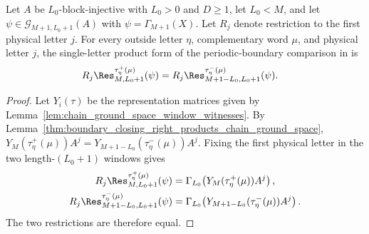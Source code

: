 \begin{lemma}
    \label{lem:closure_property_fixed_boundary_letter_chain_ground_space}
    \leanok
    Let $A$ be $L_0$-block-injective with $L_0>0$ and $D\ge1$, let
    $L_0<M$, and let $\psi\in\mathcal G_{M+1,L_0+1}(A)$ with
    $\psi=\Gamma_{M+1}(X)$. Let $R_j$ denote restriction to the first physical
    letter $j$. For every outside letter $\eta$, complementary word $\mu$, and
    physical letter $j$, the single-letter product form of the periodic-boundary
    comparison in \cite[Section~IV.C, lines~2078--2079]{Cirac2021Matrix} is
    \begin{align}
        R_j\Res^{\tau^+_\eta(\mu)}_{M,L_0+1}(\psi)
         & =
        R_j\Res^{\tau^-_\eta(\mu)}_{M+1-L_0,L_0+1}(\psi).
        \notag
    \end{align}
\end{lemma}

\begin{proof}
    \leanok
    Let $Y_i(\tau)$ be the representation matrices given by
    Lemma~\ref{lem:chain_ground_space_window_witnesses}. By
    Lemma~\ref{thm:boundary_closing_right_products_chain_ground_space},
    $Y_M(\tau^+_\eta(\mu))A^j = Y_{M+1-L_0}(\tau^-_\eta(\mu))A^j$.
    Fixing the first physical letter in the two length-$(L_0+1)$ windows gives
    \begin{align}
        R_j\Res^{\tau^+_\eta(\mu)}_{M,L_0+1}(\psi)
         & =
        \Gamma_{L_0}\!\left(Y_M(\tau^+_\eta(\mu))A^j\right),
        \notag \\
        R_j\Res^{\tau^-_\eta(\mu)}_{M+1-L_0,L_0+1}(\psi)
         & =
        \Gamma_{L_0}\!\left(Y_{M+1-L_0}(\tau^-_\eta(\mu))A^j\right).
        \notag
    \end{align}
    The two restrictions are therefore equal.
\end{proof}

